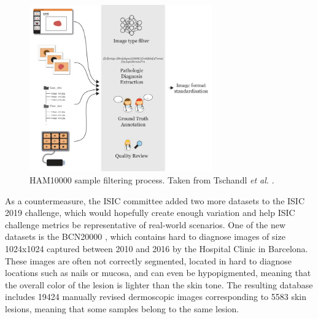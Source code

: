     \begin{figure}
      \centering
      \includegraphics[width=0.7\textwidth]{figs/ham10000.png}
      \caption[HAM10000 sample filtering process.]{\ac{HAM10000} sample filtering process. Taken from Tschandl \textit{et al.} \cite{ham10000}.}
      \label{fig:ham10000}
    \end{figure}
    
    As a countermeasure, the \ac{ISIC} committee added two more datasets to the \ac{ISIC} 2019 challenge, which would hopefully create enough variation and help \ac{ISIC} challenge metrics be representative of real-world scenarios. One of the new datasets is the BCN20000 \cite{bcn_20000}, which contains hard to diagnose images of size 1024x1024 captured between 2010 and 2016 by the Hospital Clinic in Barcelona. These images are often not correctly segmented, located in hard to diagnose locations such as nails or mucosa, and can even be hypopigmented, meaning that the overall color of the lesion is lighter than the skin tone. The resulting database includes 19424 manually revised dermoscopic images corresponding to 5583 skin lesions, meaning that some samples belong to the same lesion. \par
    
